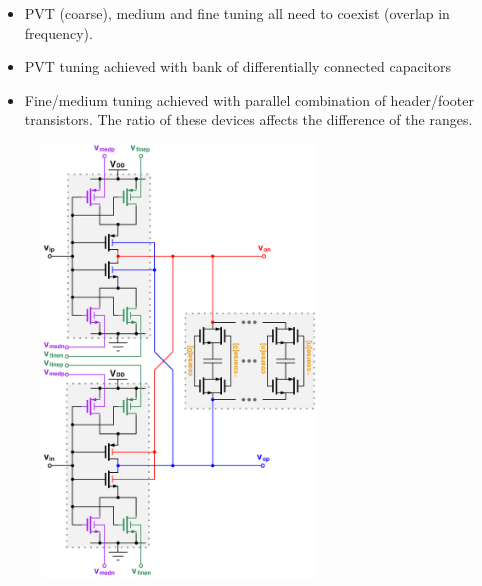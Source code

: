 			\begin{itemize}[itemsep=4pt,label=\protect---]
				\item PVT (coarse), medium and fine tuning all need to coexist (overlap in frequency).
				\item PVT tuning achieved with bank of differentially connected capacitors
				\item Fine/medium tuning achieved with parallel combination of header/footer transistors. The ratio of these devices affects the difference of the ranges.

			\end{itemize}


			\begin{figure}[htb!]
			        \centering
			        \includegraphics[width=0.65\textwidth, angle=0]{./figs/telescopic_pseudodiff_delay_cell_all_tune}
			\end{figure}


